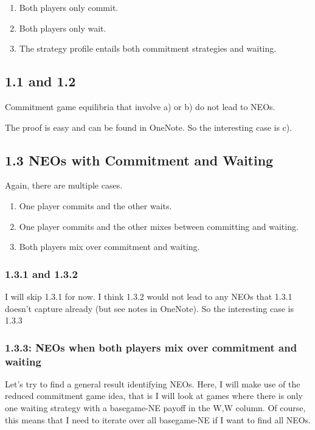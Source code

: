 \documentclass{article}
\begin{document}
\begin{enumerate}[label=\arabic*)]
    \item Both players only commit.
    \item Both players only wait.
    \item The strategy profile entails both commitment strategies and waiting.
\end{enumerate}

\subsection*{1.1 and 1.2}
\begin{lemma}
    Commitment game equilibria that involve a) or b) do not lead to NEOs.
\end{lemma}

The proof is easy and can be found in OneNote. So the interesting case is c). 

\subsection*{1.3 NEOs with Commitment and Waiting }

Again, there are multiple cases.
\begin{enumerate}[label=\arabic*)]
    \item One player commits and the other waits.
    \item One player commits and the other mixes between committing and waiting.
    \item Both players mix over commitment and waiting.
\end{enumerate}

\subsubsection*{1.3.1 and 1.3.2}
I will skip 1.3.1 for now. I think 1.3.2 would not lead to any NEOs that 1.3.1 doesn't capture already (but see notes in OneNote). So the interesting case is 1.3.3



\subsubsection*{1.3.3: NEOs when both players mix over commitment and waiting}
Let's try to find a general result identifying NEOs.
Here, I will make use of the reduced commitment game idea, that is I will look at games where there is only one waiting strategy with a basegame-NE payoff in the W,W column. Of course, this means that I need to iterate over all basegame-NE if I want to find all NEOs. 
\end{document}

